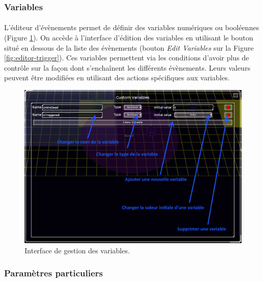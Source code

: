 \documentclass[a4paper]{article}
\begin{document}
\subsubsection{Variables}
\paragraph{ }
L'éditeur d'évènements permet de définir des variables numériques ou booléennes (Figure \ref{fig:editor-variables}). On accède à l'interface d'édition des variables en utilisant le bouton situé en dessous de la liste des évènements (bouton \textit{Edit Variables} sur la Figure \ref{fig:editor-trigger}). Ces variables permettent via les conditions d'avoir plus de contrôle sur la façon dont s'enchaînent les différents évènements. Leurs valeurs peuvent être modifiées en utilisant des actions spécifiques aux variables.
\begin{figure}[H]
\centering
\includegraphics[width=\linewidth]{editor-variables.png}
\caption{Interface de gestion des variables.}
\label{fig:editor-variables}
\end{figure}
\subsubsection{Paramètres particuliers}
\end{document}
